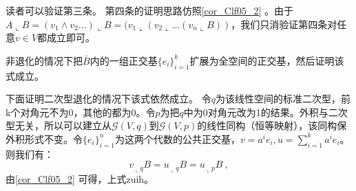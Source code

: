 读者可以验证第三条。
第四条的证明思路仿照\autoref{cor_Clf05_2} 。由于$A\llcorner B=(v_1\wedge v_2...)\llcorner B=(v_1\llcorner (v_2\llcorner...(v_n\llcorner B))$，我们只消验证第四条对任意$v\in V$都成立即可。

非退化的情况下把$\bar B$内的一组正交基$\{e_i\}^k_{i=1}$扩展为全空间的正交基，然后证明该式成立。

下面证明二次型退化的情况下该式依然成立。
令$q$为该线性空间的标准二次型，前k个对角元不为0，其他的都为0。令$p$为把$q$中为0对角元改为1的结果。外积与二次型无关，所以可以建立从$\mathcal G(V,q)$到$\mathcal G(V,p)$的线性同构（恒等映射），该同构保外积形式不变。令$\{e_i\}^n_{i=1}$为这两个代数的公共正交基，$v=a^ie_i,u=\sum \limits ^k_{i=1}a^ie_i$。则我们有：
\begin{equation}
v_{\llcorner q} B=u_{\llcorner q}B=u_{\llcorner p}B~,
\end{equation}
由\autoref{cor_Clf05_2} 可得，上式zuih。